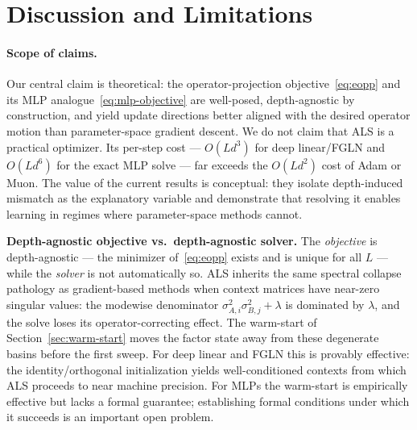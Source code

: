 \documentclass{article}
\begin{document}
\newpage
\appendix


\section{Discussion and Limitations}
\label{sec:discussion}

\paragraph{Scope of claims.}
Our central claim is theoretical: the operator-projection
objective~\eqref{eq:eopp} and its MLP analogue~\eqref{eq:mlp-objective} are
well-posed, depth-agnostic by construction, and yield update directions better
aligned with the desired operator motion than parameter-space gradient descent.
We do not claim that ALS is a practical optimizer.
Its per-step cost --- $O(Ld^3)$ for deep linear/FGLN and $O(Ld^6)$ for the
exact MLP solve --- far exceeds the $O(Ld^2)$ cost of Adam or Muon.
The value of the current results is conceptual: they isolate depth-induced
mismatch as the explanatory variable and demonstrate that resolving it enables
learning in regimes where parameter-space methods cannot.

\textbf{Depth-agnostic objective vs.\ depth-agnostic solver.}
The \emph{objective} is depth-agnostic --- the minimizer of~\eqref{eq:eopp}
exists and is unique for all $L$ --- while the \emph{solver} is not
automatically so.
ALS inherits the same spectral collapse pathology as gradient-based methods
when context matrices have near-zero singular values: the modewise denominator
$\sigma_{A,i}^2 \sigma_{B,j}^2 + \lambda$ is dominated by $\lambda$, and
the solve loses its operator-correcting effect.
The warm-start of Section~\ref{sec:warm-start} moves the factor state away from
these degenerate basins before the first sweep.
For deep linear and FGLN this is provably effective: the identity/orthogonal
initialization yields well-conditioned contexts from which ALS proceeds to
near machine precision.
For MLPs the warm-start is empirically effective but lacks a formal guarantee;
establishing formal conditions under which it succeeds is an important open
problem.
\end{document}
